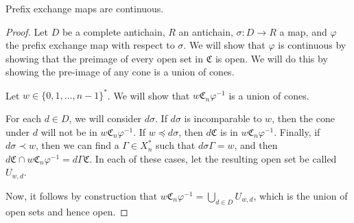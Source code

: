 \documentclass[12pt]{amsart}
\newcommand{\CS}{\mathfrak{C}}
\newcommand{\xns}{X_n^*}
\newcommand{\Cn}{\mathfrak{C}_n}
\begin{document}
        \begin{theorem}\label{pem-cts}
            Prefix exchange maps are continuous.
        \end{theorem}
        
        \begin{proof}
        
            
        
            Let $D$ be a complete antichain, $R$ an antichain, $\sigma: D \to R$ a map, and $\varphi$ the prefix exchange map with respect to $\sigma$. We will show that $\varphi$ is continuous by showing that the preimage of every open set in $\CS$ is open.  We will do this by showing the pre-image of any cone is a union of cones.
            
            Let $w\in\{0,1,\ldots, n-1\}^*$.  We will show that  $w\Cn\varphi^{-1}$ is a union of cones.
            
            For each $d \in D$, we will consider $d\sigma$. If $d\sigma$ is incomparable to $w$, then the cone under $d$ will not be in $w\Cn\varphi^{-1}$. If $w \preceq d\sigma$, then $d\CS$ is in $w\Cn\varphi^{-1}$. Finally, if $d\sigma \prec w$, then we can find a $\Gamma \in X_n^*$ such that $d\sigma\Gamma = w$, and then $d\CS \cap w\Cn\varphi^{-1} = d\Gamma\CS$. In each of these cases, let the resulting open set be called $U_{w,d}$. 
            
            Now, it follows by construction that $w\Cn\varphi^{-1} = \bigcup_{d \in D}U_{w,d}$, which is the union of open sets and hence open.
            
            \begin{comment}
            
            Let $U$ be an open set of $\CS$ and $U'$ the open set $U \cap (\bigcup_{r \in R} r\CS$). If $U'=\emptyset$, then the preimage of $U$ is the empty set, which is open.
            
            Assume that $U' \neq \emptyset$. From Lemma \ref{union-open-cones}, we can find an index set $I$ and words $w_i \in \xns$ for all $i \in I$ such that $|w_i| \geq \text{ NOOOOO ANTICHAINS CAN BE INFINITE}$. $$U' = \bigcup_{i \in I}w_i \CS.$$ Since $U' \subseteq \bigcup_{r \in R} r\CS$, for each $w_i$ we can find $r_i \in R,w_i' \in \xns$ such that $w_i = r_iw_i'$. Now, $$U' \varphi^{-1} = \bigcup_{i \in I} w_i \CS = \bigcup_{i \in I}r_iw_i'\CS = \bigcup_{i \in I} r_i \sigma^{-1} w_i' \CS,$$ a union of elements from the basis $\mathscr{B}$. This proves that $U'\varphi^{-1}$, and therefore $U \varphi^{-1}$, is open.
            
            
            \end{comment}
        \end{proof}
        
\end{document}
